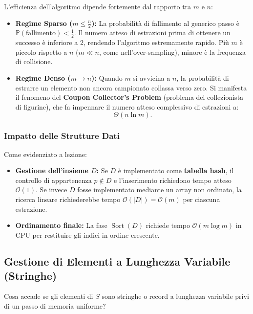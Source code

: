 \begin{property}
L'efficienza dell'algoritmo dipende fortemente dal rapporto tra $m$ e $n$:
\begin{itemize}
  \item \textbf{Regime Sparso ($m \le \frac{n}{2}$):} La probabilità di fallimento al generico passo è $\mathbb{P}(\text{fallimento}) < \frac{1}{2}$. Il numero atteso di estrazioni prima di ottenere un successo è inferiore a 2, rendendo l'algoritmo estremamente rapido. Più $m$ è piccolo rispetto a $n$ ($m \ll n$, come nell'over-sampling), minore è la frequenza di collisione.
  \item \textbf{Regime Denso ($m \to n$):} Quando $m$ si avvicina a $n$, la probabilità di estrarre un elemento non ancora campionato collassa verso zero. Si manifesta il fenomeno del \textbf{Coupon Collector's Problem} (problema del collezionista di figurine), che fa impennare il numero atteso complessivo di estrazioni a:
  \begin{equation}
    \Theta(n \ln m).
  \end{equation}
\end{itemize}
\end{property}

\subsubsection{Impatto delle Strutture Dati}
Come evidenziato a lezione:
\begin{itemize}
  \item \textbf{Gestione dell'insieme $D$:} Se $D$ è implementato come \textbf{tabella hash}, il controllo di appartenenza $p \notin D$ e l'inserimento richiedono tempo atteso $\mathcal{O}(1)$. Se invece $D$ fosse implementato mediante un array non ordinato, la ricerca lineare richiederebbe tempo $\mathcal{O}(|D|) = \mathcal{O}(m)$ per ciascuna estrazione.
  \item \textbf{Ordinamento finale:} La fase $\operatorname{Sort}(D)$ richiede tempo $\mathcal{O}(m \log m)$ in CPU per restituire gli indici in ordine crescente.
\end{itemize}

\subsection{Gestione di Elementi a Lunghezza Variabile (Stringhe)}
Cosa accade se gli elementi di $S$ sono stringhe o record a lunghezza variabile privi di un passo di memoria uniforme?

